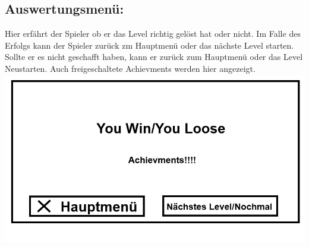 \documentclass{scrartcl}
\begin{document}
\begin{enumerate}
	\begin{minipage}{1\textwidth}
		\item \subsection*{Auswertungsmenü:}
		Hier erfährt der Spieler ob er das Level richtig gelöst hat oder nicht.
		Im Falle des Erfolgs kann der Spieler zurück zm Hauptmenü oder das nächste Level starten.
		Sollte er es nicht geschafft haben, kann er zurück zum Hauptmenü oder das Level Neustarten. Auch freigeschaltete Achievments werden hier angezeigt.\\
		\includegraphics[width=\textwidth, height=7.5cm]{assets/Auswertungsmenu}
	\end{minipage}

\end{enumerate}
\end{document}
